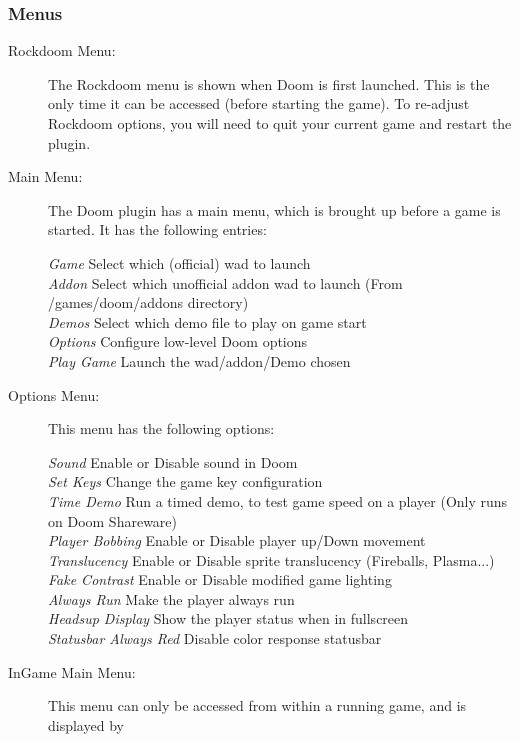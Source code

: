 \subsubsection{Menus}
\begin{description}
  \item[Rockdoom Menu: ] The Rockdoom menu is shown when Doom is first launched.  
This is the only time it can be accessed (before starting the game).  To re-adjust 
Rockdoom options, you will need to quit your current game and restart the plugin.
  \item[Main Menu: ]
  The Doom plugin has a main menu, which is brought up before a game is started. It 
  has the following entries:
  
  \emph{Game } Select which (official) wad to launch\\
  \emph{Addon } Select which unofficial addon wad to launch (From /games/doom/addons directory)\\
  \emph{Demos } Select which demo file to play on game start\\
  \emph{Options } Configure low-level Doom options\\
  \emph{Play Game } Launch the wad/addon/Demo chosen%
  
  \item[Options Menu: ]This menu has the following options:
  
  \emph{Sound } Enable or Disable sound in Doom\\
  \emph{Set Keys }  Change the game key configuration\\
  \emph{Time Demo } Run a timed demo, to test game speed on a player (Only runs on Doom Shareware)\\
  \emph{Player Bobbing } Enable or Disable player up/Down movement\\
  \emph{Translucency } Enable or Disable sprite translucency (Fireballs, Plasma...)\\
  \emph{Fake Contrast} Enable or Disable modified game lighting\\
  \emph{Always Run} Make the player always run\\
  \emph{Headsup Display} Show the player status when in fullscreen\\
  \emph{Statusbar Always Red} Disable color response statusbar%

  \item[InGame Main Menu: ]This menu can only be accessed from within a running game, and is displayed by


\end{description}
